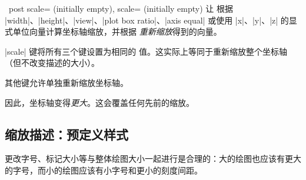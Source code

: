 \begin{pgfplotsxykeylist}{%
    \x\ post scale= (initially empty),
    scale= (initially empty)%
}
    让 \PGFPlots{} 根据 |width|、|height|、|view|、|plot box ratio|、|axis equal| 或使用 |x|、|y|、|z| 的显式单位向量计算坐标轴缩放，并根据  \emph{重新缩放}得到的向量。

    |scale| 键将所有三个键设置为相同的  值。这实际上等同于重新缩放整个坐标轴（但不改变描述的大小）。

    其他键允许单独重新缩放坐标轴。
\begin{codeexample}[]
\end{codeexample}
    因此，坐标轴变得\emph{更大}。这会覆盖任何先前的缩放。

\begin{codeexample}[]
\end{codeexample}
\end{pgfplotsxykeylist}


\subsection{缩放描述：预定义样式}
\label{sec:scaling:styles}

更改字号、标记大小等与整体绘图大小一起进行是合理的：大的绘图也应该有更大的字号，而小的绘图应该有小字号和更小的刻度间距。

